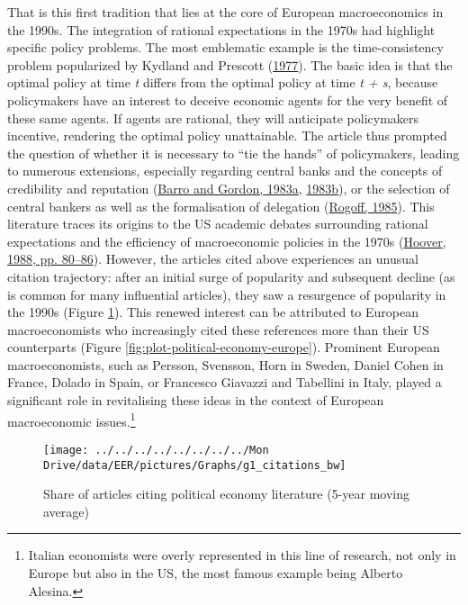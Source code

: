 \documentclass[
  12pt,
  onecolumn]{article}
\begin{document}
That is this first tradition that lies at the core of European
macroeconomics in the 1990s. The integration of rational expectations in
the 1970s had highlight specific policy problems. The most emblematic
example is the time-consistency problem popularized by Kydland and
Prescott (\protect\hyperlink{ref-kydland1977}{1977}). The basic idea is
that the optimal policy at time \emph{t} differs from the optimal policy
at time \emph{t + s}, because policymakers have an interest to deceive
economic agents for the very benefit of these same agents. If agents are
rational, they will anticipate policymakers incentive, rendering the
optimal policy unattainable. The article thus prompted the question of
whether it is necessary to ``tie the hands'' of policymakers, leading to
numerous extensions, especially regarding central banks and the concepts
of credibility and reputation (\protect\hyperlink{ref-barro1983}{Barro
and Gordon, 1983a}, \protect\hyperlink{ref-barro1983c}{1983b}), or the
selection of central bankers as well as the formalisation of delegation
(\protect\hyperlink{ref-rogoff1985b}{Rogoff, 1985}). This literature
traces its origins to the US academic debates surrounding rational
expectations and the efficiency of macroeconomic policies in the 1970s
(\protect\hyperlink{ref-hoover1988}{Hoover, 1988, pp. 80--86}). However,
the articles cited above experiences an unusual citation trajectory:
after an initial surge of popularity and subsequent decline (as is
common for many influential articles), they saw a resurgence of
popularity in the 1990s (Figure \ref{fig:plot-political-economy}). This
renewed interest can be attributed to European macroeconomists who
increasingly cited these references more than their US counterparts
(Figure \ref{fig:plot-political-economy-europe}). Prominent European
macroeconomists, such as Persson, Svensson, Horn in Sweden, Daniel Cohen
in France, Dolado in Spain, or Francesco Giavazzi and Tabellini in
Italy, played a significant role in revitalising these ideas in the
context of European macroeconomic issues.\footnote{Italian economists
  were overly represented in this line of research, not only in Europe
  but also in the US, the most famous example being Alberto Alesina.}

\begin{figure}[h]

{\centering \texttt{[image: ../../../../../../../../Mon Drive/data/EER/pictures/Graphs/g1\_citations\_bw]} 

}

\caption{Share of articles citing political economy literature (5-year moving average)}\label{fig:plot-political-economy}
\end{figure}
\end{document}
